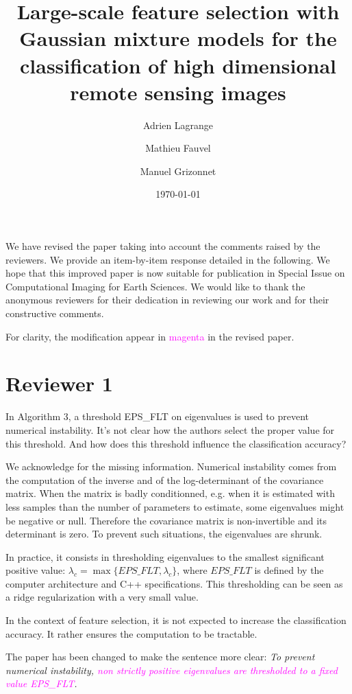 \documentclass[a4paper,10pt,DIV=16]{scrartcl}
\title{Large-scale feature selection with Gaussian mixture models for the classification of high dimensional remote sensing images}
\date{\today}
\author{Adrien Lagrange \and Mathieu Fauvel \and Manuel Grizonnet}
\newcommand{\rev}[1]{\textcolor{magenta}{#1}}
\begin{document}
\maketitle

We have revised  the paper taking into account the  comments raised by
the reviewers.   We provide an  item-by-item response detailed  in the
following.   We hope  that this  improved  paper is  now suitable  for
publication  in  {\sc  Special Issue on Computational Imaging for Earth Sciences}.   We would  like  to  thank  the
anonymous reviewers for their dedication in reviewing our work and for
their constructive comments.

For clarity,  the modification appear  in \textcolor{magenta}{magenta}
in the revised paper.


\section{Reviewer 1}

\begin{revbox}
In Algorithm 3, a threshold EPS\_FLT on eigenvalues is used to prevent numerical instability. It’s not clear how the authors select the proper value for this threshold. And how does this threshold influence the classification accuracy?

\begin{resbox}
  We acknowledge for the missing information. Numerical instability comes from the computation of the inverse and of the log-determinant of the covariance matrix. When the matrix is badly conditionned, e.g. when it is estimated with less samples than the number of parameters to estimate, some eigenvalues might be negative or null. Therefore the covariance matrix is non-invertible and its determinant is zero. To prevent such situations, the eigenvalues are shrunk.

  In practice, it consists in thresholding eigenvalues to the smallest significant positive value: $\lambda_c = \max\{EPS\_FLT,\lambda_c\}$, where $EPS\_FLT$ is defined by the computer architecture and C++ specifications. This thresholding can be seen as a ridge regularization with a very small value.

  In the context of feature selection, it is not expected to increase the classification accuracy. It rather ensures the computation to be tractable.

  The paper has been changed to make the sentence more clear: \emph{To
    prevent  numerical  instability,   \rev{non  strictly  positive
      eigenvalues are thresholded to a fixed value EPS\_FLT}.}
  \end{resbox}

\end{revbox}
\end{document}
